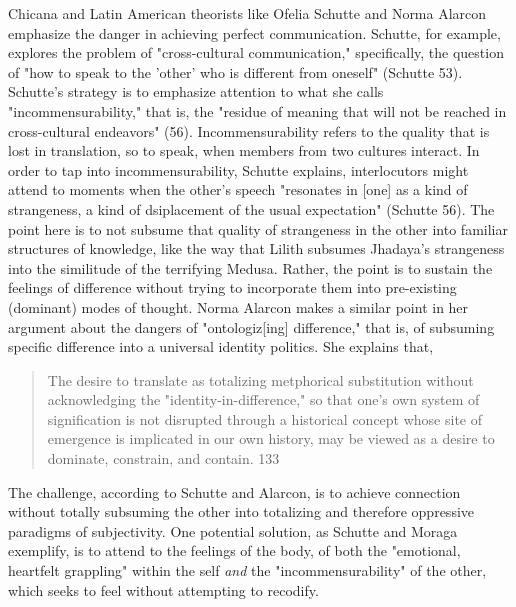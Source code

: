 \documentclass[11pt]{article}
\begin{document}
Chicana and Latin American theorists like Ofelia Schutte and Norma
Alarcon emphasize the danger in achieving perfect communication.
Schutte, for example, explores the problem of "cross-cultural
communication," specifically, the question of "how to speak to the
'other' who is different from oneself" (Schutte 53). Schutte's
strategy is to emphasize attention to what she calls
"incommensurability," that is, the "residue of meaning that will not
be reached in cross-cultural endeavors" (56). Incommensurability
refers to the quality that is lost in translation, so to speak, when
members from two cultures interact. In order to tap into
incommensurability, Schutte explains, interlocutors might attend to
moments when the other's speech "resonates in [one] as a kind of
strangeness, a kind of dsiplacement of the usual expectation" (Schutte
56). The point here is to not subsume that quality of strangeness in
the other into familiar structures of knowledge, like the way that
Lilith subsumes Jhadaya's strangeness into the similitude of the
terrifying Medusa. Rather, the point is to sustain the feelings of
difference without trying to incorporate them into pre-existing
(dominant) modes of thought. Norma Alarcon makes a similar point in
her argument about the dangers of "ontologiz[ing] difference," that
is, of subsuming specific difference into a universal identity
politics. She explains that,
\begin{quote}
The desire to translate as totalizing metphorical substitution without
acknowledging the "identity-in-difference," so that one's own system
of signification is not disrupted through a historical concept whose
site of emergence is implicated in our own history, may be viewed as
a desire to dominate, constrain, and contain. 133 
\end{quote}
The challenge, according to Schutte and Alarcon, is to achieve
connection without totally subsuming the other into totalizing and
therefore oppressive paradigms of subjectivity. One potential
solution, as Schutte and Moraga exemplify, is to attend to the
feelings of the body, of both the "emotional, heartfelt grappling"
within the self \emph{and} the "incommensurability" of the other, which
seeks to feel without attempting to recodify.
\end{document}
